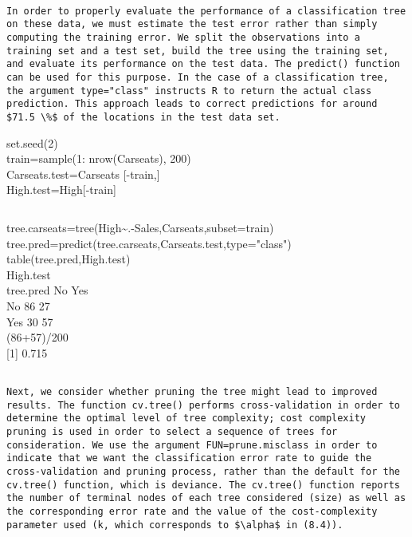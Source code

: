 \documentclass[10pt]{article}
\begin{document}
\begin{verbatim}

In order to properly evaluate the performance of a classification tree on these data, we must estimate the test error rather than simply computing the training error. We split the observations into a training set and a test set, build the tree using the training set, and evaluate its performance on the test data. The predict() function can be used for this purpose. In the case of a classification tree, the argument type="class" instructs R to return the actual class prediction. This approach leads to correct predictions for around $71.5 \%$ of the locations in the test data set.
\end{verbatim}

\begin{displayquote}
set.seed(2)\\
train=sample(1: nrow(Carseats), 200)\\[0pt]
Carseats.test=Carseats [-train,]\\[0pt]
High.test=High[-train]
\end{displayquote}

\begin{verbatim}

\end{verbatim}

\begin{displayquote}
tree.carseats=tree(High\~{}.-Sales,Carseats,subset=train)\\
tree.pred=predict(tree.carseats,Carseats.test,type="class")\\
table(tree.pred,High.test)\\
High.test\\
tree.pred No Yes\\
No 86 27\\
Yes 30 57\\
(86+57)/200\\[0pt]
[1] 0.715
\end{displayquote}

\begin{verbatim}

Next, we consider whether pruning the tree might lead to improved results. The function cv.tree() performs cross-validation in order to determine the optimal level of tree complexity; cost complexity pruning is used in order to select a sequence of trees for consideration. We use the argument FUN=prune.misclass in order to indicate that we want the classification error rate to guide the cross-validation and pruning process, rather than the default for the cv.tree() function, which is deviance. The cv.tree() function reports the number of terminal nodes of each tree considered (size) as well as the corresponding error rate and the value of the cost-complexity parameter used (k, which corresponds to $\alpha$ in (8.4)).
\end{verbatim}
\end{document}
